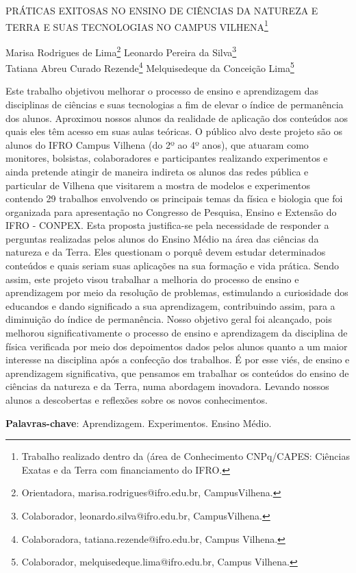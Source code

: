 \documentclass[article,12pt,onesidea,4paper,english,brazil]{abntex2}
\begin{document}
	
	
	\frenchspacing 
	
	\begin{center}
		\LARGE PRÁTICAS EXITOSAS NO ENSINO DE CIÊNCIAS DA NATUREZA E TERRA E SUAS TECNOLOGIAS NO CAMPUS VILHENA\footnote{Trabalho realizado dentro da (área de Conhecimento CNPq/CAPES: Ciências Exatas e da Terra com financiamento do IFRO.}
		
		\normalsize
		Marisa Rodrigues de Lima\footnote{Orientadora, marisa.rodrigues@ifro.edu.br, CampusVilhena.} 
		Leonardo Pereira da Silva\footnote{Colaborador, leonardo.silva@ifro.edu.br, CampusVilhena.} \\
		Tatiana Abreu Curado Rezende\footnote{Colaboradora, tatiana.rezende@ifro.edu.br, Campus Vilhena.} 
		Melquisedeque da Conceição Lima\footnote{Colaborador, melquisedeque.lima@ifro.edu.br, Campus Vilhena.} 
	\end{center}
	
	\noindent Este trabalho objetivou melhorar o processo de ensino e aprendizagem das disciplinas de ciências e suas tecnologias a fim de elevar o índice de permanência dos alunos. Aproximou nossos alunos da realidade de aplicação dos conteúdos aos quais eles têm acesso em suas aulas teóricas. O público alvo deste projeto são os alunos do IFRO Campus Vilhena (do 2º ao 4º anos), que atuaram como monitores, bolsistas, colaboradores e participantes realizando experimentos e ainda pretende atingir de maneira indireta os alunos das redes pública e particular de Vilhena que visitarem a mostra de modelos e experimentos contendo 29 trabalhos envolvendo os principais temas da física e biologia que foi organizada para apresentação no Congresso de Pesquisa, Ensino e Extensão do IFRO - CONPEX. Esta proposta justifica-se pela necessidade de responder a perguntas realizadas pelos alunos do Ensino Médio na área das ciências da natureza e da Terra. Eles questionam o porquê devem estudar determinados conteúdos e quais seriam suas aplicações na sua formação e vida prática.  Sendo assim, este projeto visou trabalhar a melhoria do processo de ensino e aprendizagem por meio da resolução de problemas, estimulando a curiosidade dos educandos e dando significado a sua aprendizagem, contribuindo assim, para a diminuição do índice de permanência. Nosso objetivo geral foi alcançado, pois melhorou significativamente o processo de ensino e aprendizagem da disciplina de física verificada por meio dos depoimentos dados pelos alunos quanto a um maior interesse na disciplina após a confecção dos trabalhos. É por esse viés, de ensino e aprendizagem significativa, que pensamos em trabalhar os conteúdos do ensino de ciências da natureza e da Terra, numa abordagem inovadora. Levando nossos alunos a descobertas e reflexões sobre os novos conhecimentos.
	
	\vspace{\onelineskip}
	
	\noindent
	\textbf{Palavras-chave}: Aprendizagem. Experimentos. Ensino Médio.
	
\end{document}
